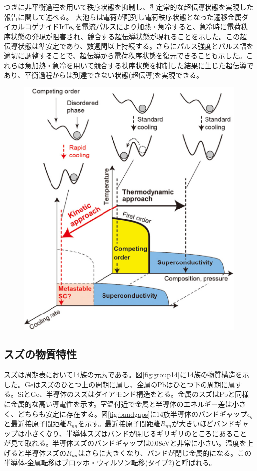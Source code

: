 つぎに非平衡過程を用いて秩序状態を抑制し、準定常的な超伝導状態を実現した報告に関して述べる。
大池らは電荷が配列し電荷秩序状態となった遷移金属ダイカルコゲナイドIrTe$_2$を電流パルスにより加熱・急冷すると、急冷時に電荷秩序状態の発現が阻害され、競合する超伝導状態が現れることを示した\cite{Oike}。この超伝導状態は準安定であり、数週間以上持続する。さらにパルス強度とパルス幅を適切に調整することで、超伝導から電荷秩序状態を復元できることも示した。これらは急加熱・急冷を用いて競合する秩序状態を抑制した結果に生じた超伝導であり、平衡過程からは到達できない状態(超伝導)を実現できる。
\begin{figure}[!h]
    \begin{center}
   \includegraphics[width=0.6\hsize]{Introduction/kinetic_approach.eps}
  \end{center}
  \caption{}
  \label{fig:phase_diagram2}
\end{figure}


\subsection{スズの物質特性}
スズは周期表において14族の元素である。図\ref{fig:group14}に14族の物質構造を示した。Geはスズのひとつ上の周期に属し、金属のPbはひとつ下の周期に属する。SiとGe、半導体のスズはダイアモンド構造をとる。金属のスズはPbと同様に金属的な高い導電性を示す。室温付近で金属と半導体のエネルギー差は小さく、どちらも安定に存在する。図\ref{fig:bandgaps}に14族半導体のバンドギャップ$\epsilon_g$と最近接原子間距離$R_{nn}$を示す\cite{Yonezawa}。最近接原子間距離$R_{nn}$が大きいほどバンドギャップは小さくなり、半導体スズはバンドが閉じるギリギリのところにあることが見て取れる。半導体スズのバンドギャップは0.08eVと非常に小さい。温度を上げると半導体スズの$R_{nn}$はさらに大きくなり、バンドが閉じ金属的になる。この半導体-金属転移はブロッホ・ウィルソン転移(タイプ2)と呼ばれる\cite{Yonezawa}。

